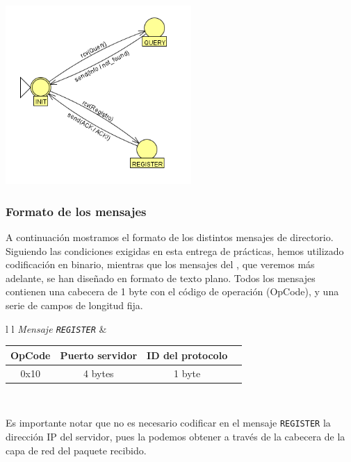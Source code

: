 \begin{center}
    \includegraphics[width=200pt]{Images/Automata_Directorio.png}    
\end{center}

\subsubsection{Formato de los mensajes} %
A continuación mostramos el formato de los distintos mensajes de directorio. Siguiendo las condiciones exigidas en esta entrega de prácticas, hemos utilizado codificación en binario, mientras que los mensajes del , que veremos más adelante, se han diseñado en formato de texto plano. Todos los mensajes contienen una cabecera de 1 byte con el código de operación (OpCode), y una serie de campos de longitud fija.

\begin{table}[H]
\begin{tabular}{l l}
    \textit{Mensaje \lstinline!REGISTER!} &
        \begin{tabular}{|c|c|c|c|}\hline
             OpCode & Puerto servidor & ID del protocolo \\ \hline
             0x10 & 4 bytes & 1 byte \\ \hline %
        \end{tabular}
    \\
\end{tabular}
\end{table}

Es importante notar que no es necesario codificar en el mensaje \lstinline!REGISTER! la dirección IP del servidor, pues la podemos obtener a través de la cabecera de la capa de red del paquete recibido.

